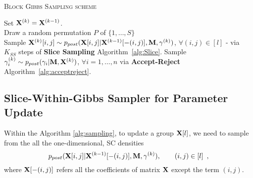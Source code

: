 {\fontsize{4}{4}\selectfont
\begin{algorithm}[t]
\caption{\textsc{Block Gibbs Sampling scheme}}

    {%
    Set $\mathbf{X}^{(k)} = \mathbf{X}^{(k-1)}$.\\
    		{
    		Draw a random permutation $P$ of $\{1,\ldots,S\}$\\
    			{
			Sample $\mathbf{X}^{(k)}[i,j] \sim p_{post}(\mathbf{X}[i,j]|\mathbf{X}^{(k-1)}[-(i,j)],\mathbf{M},\mathbf{\gamma}^{(k)})$, $\forall (i,j)\in [l]$ - via $K_{SS}$ steps of \textbf{Slice Sampling} Algorithm~\ref{alg:Slice}.
			}
		}
	{Sample $\gamma^{(k)}_{i} \sim p_{post}(\gamma_{i}|\mathbf{M},\mathbf{X}^{(k)})$, $\forall i =1,\ldots,n$ via \textbf{Accept-Reject} Algorithm~\ref{alg:acceptreject}.}

    }
\label{alg:sampling}
\end{algorithm}
}


\subsection{Slice-Within-Gibbs Sampler for Parameter Update}\label{sec:DetailsGammaSampler}

Within the Algorithm \ref{alg:sampling}, to update a group $\mathbf{X}[l]$, we need to sample from the all the one-dimensional, SC densities
\begin{equation}
p_{post}(\mathbf{X}[i,j]|\mathbf{X}^{(k-1)}[-(i,j)],\mathbf{M},\mathbf{\gamma}^{(k)}), \qquad (i,j) \in [l] \enspace ,
\end{equation}
where $\mathbf{X}[-(i,j)]$ refers all the coefficients of matrix $\mathbf{X}$ except the term $(i,j)$.

